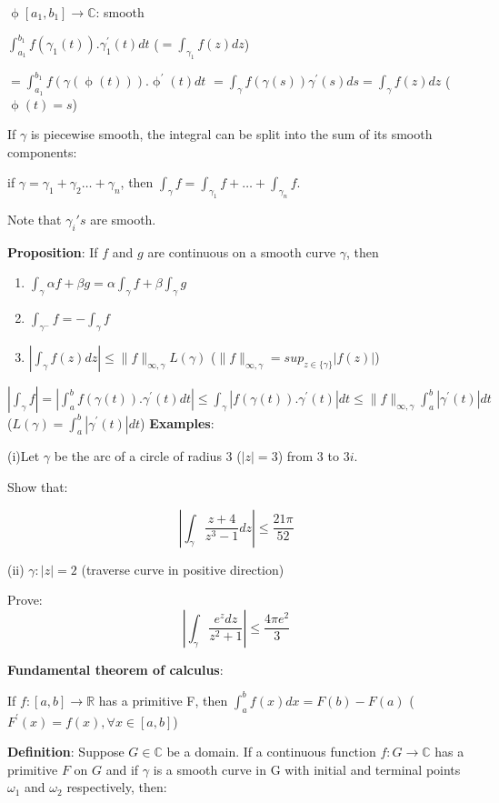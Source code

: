 \documentclass{article}
\begin{document}
\begin{flushleft}
$\upphi[a_1,b_1] \rightarrow \mathds{C}$: smooth 

$\int_{a_1}^{b_1}f(\gamma_1(t)).\gamma_1^{'}(t)dt$ ($=\int_{\gamma_1}^{}f(z) dz$)

$=\int_{a_1}^{b_1}f(\gamma(\upphi(t))).\upphi^{'}(t) dt$
$=\int_{\gamma}^{} f(\gamma(s)) \gamma^{'}(s) ds=\int_{\gamma}^{}f(z) dz$ ($\upphi(t)=s$)

If $\gamma$ is piecewise smooth, the integral can be split into the sum of its smooth components:

if $\gamma=\gamma_1+\gamma_2 \dots +\gamma_n$, then $\int_{\gamma}^{} f = \int_{\gamma_1}^{} f + \dots + \int_{\gamma_n}^{} f$.

Note that $\gamma_i's$ are smooth.

\textbf{Proposition}: If $f$ and $g$ are continuous on a smooth curve $\gamma$, then 
\begin{enumerate}
    \item $\int_{\gamma}^{} \alpha f+\beta g = \alpha \int_{\gamma}^{} f + \beta\int_{\gamma}^{} g$
    \item $\int_{\gamma^{-}}^{} f = - \int_{\gamma}^{} f$
    \item $|\int_{\gamma}^{} f(z) dz| \leq \|f\|_{\infty,\gamma} L(\gamma)$ ($\|f\|_{\infty,\gamma}=sup_{z\in \{\gamma\}}|f(z)|$)
\end{enumerate}

$|\int_{\gamma}^{} f|= |\int_{a}^{b} f(\gamma(t)).\gamma^{'}(t) dt| \leq \int_{\gamma}^{} |f(\gamma(t)).\gamma^{'}(t)| dt
\leq \|f\|_{\infty,\gamma} \int_{a}^{b} |\gamma^{'}(t)| dt$   ($L(\gamma)=\int_{a}^{b} |\gamma^{'}(t)| dt$)
\textbf{Examples}: 

(i)Let $\gamma$ be the arc of a circle of radius 3 ($|z|=3$) from $3$ to $3i$.

Show that:

$$|\int_{\gamma}^{} \frac{z+4}{z^3-1} dz| \leq \frac{21\pi}{52}$$

(ii) $\gamma: |z|=2$  (traverse curve in positive direction)

Prove: $$|\int_{\gamma}^{} \frac{e^z dz}{z^2+1} | \leq \frac{4\pi e^2}{3}$$

\textbf{Fundamental theorem of calculus}: 

If $f:[a,b]\rightarrow \mathds{R}$ has a primitive F, then $\int_{a}^{b} f(x) dx =F(b)-F(a)$ ($F^{'}(x)=f(x), \forall x\in [a,b]$)

\textbf{Definition}: Suppose $G\in \mathds{C}$ be a domain. If a continuous function $f:G\rightarrow \mathds{C}$ has a primitive $F$ on $G$ and if $\gamma$ is a smooth curve in G with initial and terminal points $\omega_1$ and $\omega_2$ respectively, then:


\end{flushleft}
\end{document}
